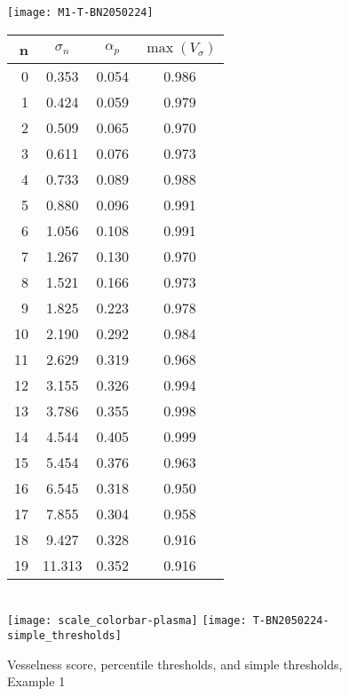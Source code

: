 %

\begin{figure}
  \begin{minipage}[tp]{0.5\textwidth}
    \texttt{[image: M1-T-BN2050224]}
  \end{minipage}
  \begin{minipage}[tp]{0.5\textwidth}
    \begin{tabular}{r|c|c|c}
      n  & $\sigma_n$  &  $\alpha_p$  &  $\max(V_\sigma)$ \\
      \hline
      0  &   0.353 &  0.054 &  0.986\\
      1  &   0.424 &  0.059 &  0.979\\
      2  &   0.509 &  0.065 &  0.970\\
      3  &   0.611 &  0.076 &  0.973\\
      4  &   0.733 &  0.089 &  0.988\\
      5  &   0.880 &  0.096 &  0.991\\
      6  &   1.056 &  0.108 &  0.991\\
      7  &   1.267 &  0.130 &  0.970\\
      8  &   1.521 &  0.166 &  0.973\\
      9  &   1.825 &  0.223 &  0.978\\
      10 &   2.190 &  0.292 &  0.984\\
      11 &   2.629 &  0.319 &  0.968\\
      12 &   3.155 &  0.326 &  0.994\\
      13 &   3.786 &  0.355 &  0.998\\
      14 &   4.544 &  0.405 &  0.999\\
      15 &   5.454 &  0.376 &  0.963\\
      16 &   6.545 &  0.318 &  0.950\\
      17 &   7.855 &  0.304 &  0.958\\
      18 &   9.427 &  0.328 &  0.916\\
      19 &  11.313 &  0.352 &  0.916\\
    \end{tabular} \\
    \texttt{[image: scale\_colorbar-plasma]} \;
    \texttt{[image: T-BN2050224-simple\_thresholds]}
  \end{minipage}
  \caption{Vesselness score, percentile thresholds, and simple thresholds,  Example 1}
  \label{fig:detailed_output_with_table_ex1}
\end{figure}


